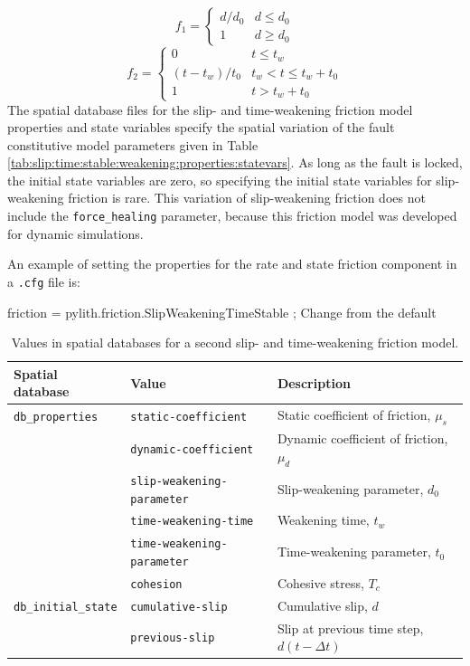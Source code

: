 \begin{equation}
f_{1}=\begin{cases}
d/d_{0} & d\leq d_{0}\\
1 & d\ge d_{0}
\end{cases}
\end{equation}
\begin{equation}
f_{2}=\begin{cases}
0 & t\leq t_{w}\\
(t-t_{w})/t_{0} & t_{w}<t\le t_{w}+t_{0}\\
1 & t>t_{w}+t_{0}
\end{cases}
\end{equation}
The spatial database files for the slip- and time-weakening friction
model properties and state variables specify the spatial variation
of the fault constitutive model parameters given in Table \vref{tab:slip:time:stable:weakening:properties:statevars}.
As long as the fault is locked, the initial state variables are zero,
so specifying the initial state variables for slip-weakening friction
is rare. This variation of slip-weakening friction does not include
the \texttt{force\_healing} parameter, because this friction model
was developed for dynamic simulations.

An example of setting the properties for the rate and state friction
component in a \texttt{.cfg} file is:
\begin{lyxcode}

friction = pylith.friction.SlipWeakeningTimeStable ; Change from the default
\end{lyxcode}

\begin{table}[htbp]
\caption{Values
in spatial databases for a second slip- and time-weakening friction model.}
\label{tab:slip:time:stable:weakening:properties:statevars}
\begin{tabular}{llp{2.5in}}
\textbf{Spatial database} & \textbf{Value} & \textbf{Description}\\
\hline 
\texttt{db\_properties} & \texttt{static-coefficient} & Static coefficient of friction, $\mu_{s}$\\
 & \texttt{dynamic-coefficient} & Dynamic coefficient of friction, $\mu_{d}$\\
 & \texttt{slip-weakening-parameter} & Slip-weakening parameter, $d_{0}$\\
 & \texttt{time-weakening-time} & Weakening time, $t_{w}$\\
 & \texttt{time-weakening-parameter} & Time-weakening parameter, $t_{0}$\\
 & \texttt{cohesion} & Cohesive stress, $T_{c}$\\
\texttt{db\_initial\_state} & \texttt{cumulative-slip} & Cumulative slip, $d$\\
 & \texttt{previous-slip} & Slip at previous time step, $d(t-\Delta t)$\\
\hline 
\end{tabular}
\end{table}


